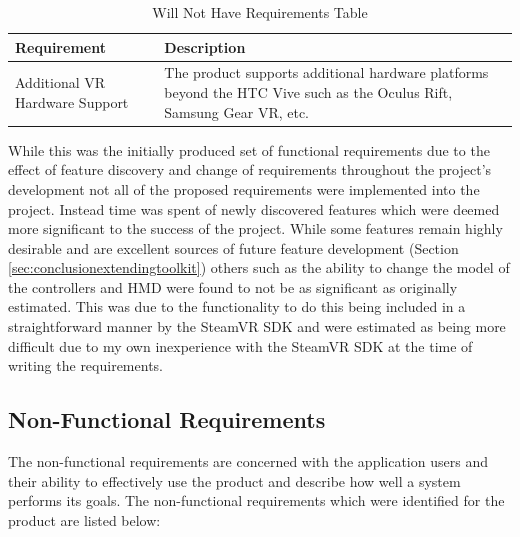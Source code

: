\documentclass{l4proj}
\begin{document}
\begin{table}[]
    \centering
    \begin{tabular}{ | p{5.5cm} | p{10.5cm} |}
        \hline
        Requirement & Description \\ \hline
        Additional VR Hardware Support & The product supports additional hardware platforms beyond the HTC Vive such as the Oculus Rift, Samsung Gear VR, etc. \\ \hline
    \end{tabular}
    \caption{Will Not Have Requirements Table}
    \label{tab:willnothave}
\end{table}

\newpage
While this was the initially produced set of functional requirements due to the effect of feature discovery and change of requirements throughout the project's development not all of the proposed requirements were implemented into the project. Instead time was spent of newly discovered features which were deemed more significant to the success of the project. While some features remain highly desirable and are excellent sources of future feature development (Section \ref{sec:conclusionextendingtoolkit}) others such as the ability to change the model of the controllers and HMD were found to not be as significant as originally estimated. This was due to the functionality to do this being included in a straightforward manner by the SteamVR SDK and were estimated as being more difficult due to my own inexperience with the SteamVR SDK at the time of writing the requirements.

\subsection{Non-Functional Requirements}
\label{sec:requirementsnonfunctional}
The non-functional requirements are concerned with the application users and their ability to effectively use the product and describe how well a system performs its goals. The non-functional requirements which were identified for the product are listed below: 
\end{document}
